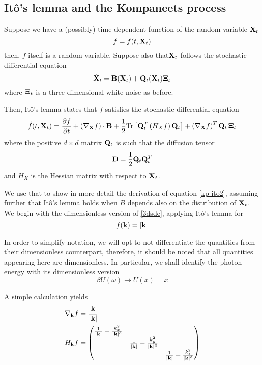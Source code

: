 \documentclass[a4paper,12pt,reqno,superscriptaddress,nofootinbib]{revtex4}
\newcommand{\0}{^{(0)}}
\newcommand{\1}{^{(1)}}
\newcommand{\2}{^{(2)}}
\begin{document}
\begin{appendix}

\section{It\^o's lemma and the Kompaneets process}\label{itoder}

Suppose we have a (possibly) time-dependent function of the random variable $\vb{X}_t$
\[f=f(t,\vb{X}_t) \]
then, $f$ itself is a random variable. Suppose also that$\vb{X}_t$ follows the stochastic differential equation \begin{equation*}
	\dot{\vb{X}}_t=\vb{B}(\vb{X}_t) + \vb{Q}_t(\vb{X}_t)\vb{\Xi}_t
\end{equation*}
where $\vb{\Xi}_t$ is a three-dimensional white noise as before.

Then, Itô's lemma states that $f$ satisfies the stochastic differential equation
\begin{equation}\label{ilem}
	\dot{f} (t, \vb{X}_t)= \frac{\partial f}{\partial t}+ \left(\nabla_{\vb{X}}f\right)\cdot\vb{B} +\frac{1}{2}\mathrm{Tr}\left[\vb{Q}^T_t\left(H_Xf\right)\vb{Q}_t\right] + \left(\nabla_{\vb{X}}f\right)^T\vb{Q}_t\, \vb{\Xi}_t
\end{equation}
where the positive $d\times d$ matrix $\vb{Q}_t$ is such that the diffusion tensor
\[\vb{D}=\frac{1}{2}\vb{Q}_t\vb{Q}^T_t\]
and $H_X$ is the Hessian matrix with respect to $\vb{X}_t$. 


We use that to show in more detail the derivation of equation \eqref{kp-ito2}, assuming further that Itô's lemma holds when $B$ depends also on the distribution of $\vb{X}_t$.  We begin with the dimensionless version of \eqref{3dsde}, applying Itô's lemma for 
\[f(\vb{k})=|\vb{k}|\]

In order to simplify notation, we will opt to not differentiate the quantities from their dimensionless counterpart, therefore, it should be noted that all quantities appearing here are dimensionless. In particular, we shall identify the photon energy with its dimensionless version
\[\beta U (\omega) \to U(x)=x\]

A simple calculation yields
\begin{align*}
	&\nabla_{\vb{k}}f =  \frac{\vb{k}}{|\vb{k}|}\\
	&H_{\vb{k}}f = 
	\begin{pmatrix}
		\frac{1}{|\vb{k}|}	-\frac{k_x^2}{|\vb{k}|^3} & & \\
		&\frac{1}{|\vb{k}|} -\frac{k_y^2}{|\vb{k}|^3}  &\\
		& & \frac{1}{|\vb{k}|}- \frac{k_z^2}{|\vb{k}|^3}
	\end{pmatrix}
\end{align*}


\end{appendix}
\end{document}
